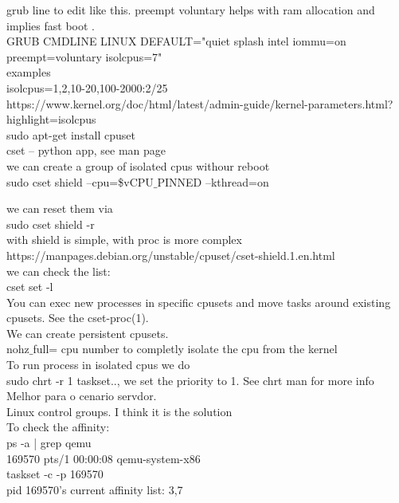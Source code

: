 \documentclass[11pt, a4paper, oneside]{article}
\theoremstyle{definition}
\begin{document}
grub line to edit like this. preempt voluntary helps with ram allocation and implies fast boot .\\
GRUB CMDLINE LINUX DEFAULT="quiet splash intel iommu=on preempt=voluntary isolcpus=7"\\

examples\\
isolcpus=1,2,10-20,100-2000:2/25\\

https://www.kernel.org/doc/html/latest/admin-guide/kernel-parameters.html?highlight=isolcpus\\

sudo apt-get install cpuset\\
cset -- python app, see man page\\
we can create a group of isolated cpus withour reboot\\
sudo cset shield --cpu=\${vCPU$\_$PINNED} --kthread=on

we can reset them via \\
sudo cset shield -r\\

with shield is simple, with proc is more complex\\
https://manpages.debian.org/unstable/cpuset/cset-shield.1.en.html\\

we can check the list: \\
cset set -l\\

You can exec new processes in specific cpusets and move tasks around existing cpusets. See the cset-proc(1).\\
We can create persistent cpusets.\\

nohz$\_$full= cpu number to completly isolate the cpu from the kernel\\

To run process in isolated cpus we do \\
sudo chrt -r 1 taskset.., we set the priority to 1. See chrt man for more info\\

Melhor para o cenario servdor.\\

Linux control groups. I think it is the solution\\

To check the affinity:\\
ps -a | grep qemu\\
 	169570 pts/1    00:00:08 qemu-system-x86\\
taskset -c -p 169570\\
	pid 169570's current affinity list: 3,7\\
\end{document}
